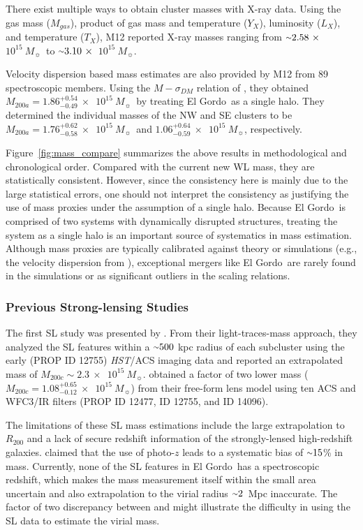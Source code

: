 \documentclass[twocolumn]{aastex631}
\newcommand{\elgordo}{El Gordo}
\newcommand{\HST}{{\it HST}}
\newcommand{\mytilde}{\raise.19ex\hbox{$\scriptstyle\sim$}}
\newcommand{\solarmA}{$10^{15}~M_{\sun}$}
\begin{document}
There exist multiple ways to obtain cluster masses with X-ray data. 
Using the gas mass ($M_{gas}$), product of gas mass and temperature ($Y_X$), luminosity ($L_X$), and temperature ($T_X$), M12 reported X-ray masses ranging from $\mytilde2.58~\times$~\solarmA~to $\mytilde3.10~\times$~\solarmA. 


Velocity dispersion based mass estimates are also provided by M12 from 89 spectroscopic members. 
Using the $M-\sigma_{DM}$ relation of \cite{Evrard2008}, they obtained $M_{200a}= 1.86^{+0.54}_{-0.49}~\times$~\solarmA~by treating \elgordo~as a single halo. 
They determined the individual masses of the NW and SE clusters to be $M_{200a}=1.76^{+0.62}_{-0.58}~\times$~\solarmA~and $1.06^{+0.64}_{-0.59}~\times$~\solarmA, respectively. 


Figure~\ref{fig:mass_compare} summarizes the above results in methodological and chronological order. 
Compared with the current new WL mass, they are statistically consistent. 
However, since the consistency here is mainly due to the large statistical errors, one should not interpret the consistency as justifying the use of mass proxies under the assumption of a single halo. 
Because \elgordo~is comprised of two systems with dynamically disrupted structures, treating the system as a single halo is an important source of systematics in mass estimation. 
Although mass proxies are typically calibrated against theory or simulations (e.g., the velocity dispersion from \citealt{Evrard2008}), exceptional mergers like \elgordo~are rarely found in the simulations or as significant outliers in the scaling relations. 


\subsubsection{Previous Strong-lensing Studies} \label{mass_compare_SL}
The first SL study was presented by \cite{Zitrin2013}. 
From their light-traces-mass approach, they analyzed the SL features within a $\mytilde500$ kpc radius of each subcluster using the early (PROP ID 12755) \HST/ACS imaging data and reported an extrapolated mass of $M_{200c}\sim2.3~\times$~\solarmA. 
\cite{Diego2020} obtained a factor of two lower mass ($M_{200c} = 1.08^{+0.65}_{-0.12}~\times$~\solarmA) from their free-form lens model using ten ACS and WFC3/IR filters (PROP ID 12477, ID 12755, and ID 14096).


The limitations of these SL mass estimations include the large extrapolation to $R_{200}$ and a lack of secure redshift information of the strongly-lensed high-redshift galaxies. 
\cite{Cerny2018} claimed that the use of photo-$z$ leads to a systematic bias of $\mytilde15$\% in mass. Currently, none of the SL features in \elgordo~has a spectroscopic redshift, which makes the mass measurement itself within the small area uncertain and also extrapolation to the virial radius $\mytilde2$~Mpc inaccurate. 
The factor of two discrepancy between \cite{Zitrin2013} and \cite{Diego2020} might illustrate the difficulty in using the SL data to estimate the virial mass.
\end{document}
